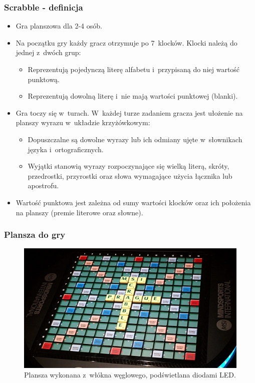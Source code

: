 \documentclass[10pt,a4paper]{beamer}
\begin{document}
\begin{frame}
	\frametitle{Scrabble - definicja}

	\begin{itemize}
		\item Gra planszowa dla 2-4 osób.
		\item Na początku gry każdy gracz otrzymuje po 7~klocków. Klocki należą do jednej z~dwóch grup:
			\begin{itemize}
				\item Reprezentują pojedynczą literę alfabetu i~przypisaną do niej wartość punktową.
				\item Reprezentują dowolną literę i~nie mają wartości punktowej (blanki).
			\end{itemize}
		\item Gra toczy się w~turach. W~każdej turze zadaniem gracza jest ułożenie na planszy wyrazu w~układzie krzyżówkowym:
			\begin{itemize}
				\item Dopuszczalne są dowolne wyrazy lub ich odmiany ujęte w~słownikach języka i~ortograficznych.
				\item Wyjątki stanowią wyrazy rozpoczynające się wielką literą, skróty, przedrostki, przyrostki oraz słowa wymagające użycia łącznika lub apostrofu. 
			\end{itemize}
		\item Wartość punktowa jest zależna od sumy wartości klocków oraz ich położenia na planszy (premie literowe oraz słowne).
	\end{itemize}
\end{frame}

\begin{frame}
	\frametitle{Plansza do gry}

	\begin{figure}
		\centering
		\includegraphics[scale=0.17]{graphics/board.jpg}
		\caption{Plansza wykonana z~włókna węglowego, podświetlana diodami LED.}
	\end{figure}
\end{frame}
\end{document}
